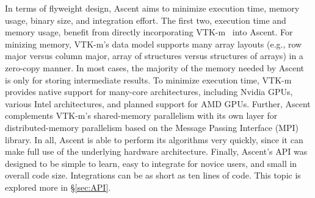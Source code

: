 In terms of flyweight design, Ascent aims to minimize
execution time, memory usage, binary size, and integration effort.
%
The first two, execution time and memory usage, benefit from directly
incorporating VTK-m~\cite{Moreland:CGA2016} into Ascent.
%
For minizing memory,
VTK-m's data model supports many array layouts (e.g., row major versus
column major, array of structures versus structures of arrays)
in a zero-copy manner.
%
In most cases, the majority of the memory needed by Ascent is only for
storing intermediate results.
%
To minimize execution time,
VTK-m provides native support for many-core architectures,
including Nvidia GPUs, various Intel architectures,
and planned support for AMD GPUs.
%
Further, Ascent complements VTK-m's shared-memory parallelism with
its own layer for distributed-memory parallelism based on the
Message Passing Interface (MPI) library.
%
In all, Ascent is able to perform its algorithms very quickly,
since it can make full use of the underlying hardware architecture.
%
%
Finally, Ascent's API was designed to be simple to learn,
easy to integrate for novice users, and small in overall code size.
%
Integrations can be as short as ten lines of code.
%
This topic is explored more in \S\ref{sec:API}.

